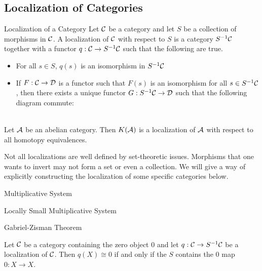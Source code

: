 \documentclass[a4paper]{article}
\begin{document}
\subsection{Localization of Categories}
\begin{defn}{Localization of a Category}{} Let $\mathcal{C}$ be a category and let $S$ be a collection of morphisms in $\mathcal{C}$. A localization of $\mathcal{C}$ with respect to $S$ is a category $S^{-1}\mathcal{C}$ together with a functor $q:\mathcal{C}\to S^{-1}\mathcal{C}$ such that the following are true. 
\begin{itemize}
\item For all $s\in S$, $q(s)$ is an isomorphism in $S^{-1}\mathcal{C}$
\item If $F:\mathcal{C}\to\mathcal{D}$ is a functor such that $F(s)$ is an isomorphism for all $s\in S^{-1}\mathcal{C}$, then there exists a unique functor $G:S^{-1}\mathcal{C}\to\mathcal{D}$ such that the following diagram commute: \\~\\
\end{itemize}
\end{defn}

\begin{lmm}{}{} Let $\mathcal{A}$ be an abelian category. Then $K(\mathcal{A})$ is a localization of $\mathcal{A}$ with respect to all homotopy equivalences. 
\end{lmm}

Not all localizations are well defined by set-theoretic issues. Morphisms that one wants to invert may not form a set or even a collection. We will give a way of explicitly constructing the localization of some specific categories below. 

\begin{defn}{Multiplicative System}{}
\end{defn}

\begin{defn}{Locally Small Multiplicative System}{}
\end{defn}

\begin{thm}{Gabriel-Zisman Theorem}{}
\end{thm}

\begin{crl}{}{} Let $\mathcal{C}$ be a category containing the zero object $0$ and let $q:\mathcal{C}\to S^{-1}\mathcal{C}$ be a localization of $\mathcal{C}$. Then $q(X)\cong 0$ if and only if the $S$ contains the $0$ map $0:X\to X$. 
\end{crl}
\end{document}
